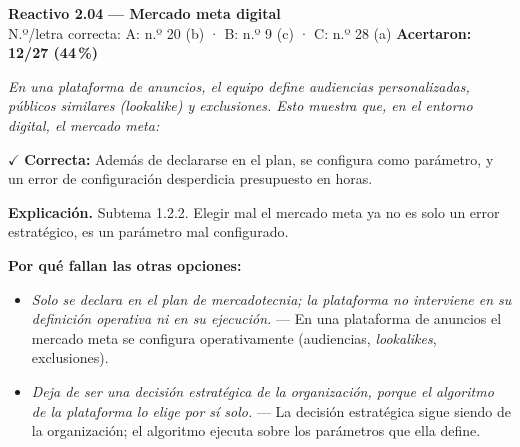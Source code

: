 \documentclass[10pt,letterpaper]{article}
\begin{document}
\begin{minipage}{\textwidth}
{\color{guinda}\textbf{Reactivo 2.04}} \textbf{— Mercado meta digital}\\[-1pt]
{\scriptsize N.º/letra correcta: A: n.º 20 (b) · B: n.º 9 (c) · C: n.º 28 (a) \hfill \textbf{Acertaron: 12/27 (44\,\%)}}

\textit{En una plataforma de anuncios, el equipo define audiencias personalizadas, públicos similares (\textit{lookalike}) y exclusiones. Esto muestra que, en el entorno digital, el mercado meta:}

\textcolor{verde}{$\checkmark$} \textbf{Correcta:} Además de declararse en el plan, se configura como parámetro, y un error de configuración desperdicia presupuesto en horas.

\textbf{Explicación.} Subtema 1.2.2. Elegir mal el mercado meta ya no es solo un error estratégico, es un parámetro mal configurado.

\textbf{Por qué fallan las otras opciones:}
\begin{itemize}[itemsep=0pt,topsep=1pt,leftmargin=1.3em,parsep=0pt]
\item[\textcolor{rojo}{$\times$}] \textit{Solo se declara en el plan de mercadotecnia; la plataforma no interviene en su definición operativa ni en su ejecución.} --- En una plataforma de anuncios el mercado meta se configura operativamente (audiencias, \textit{lookalikes}, exclusiones).
\item[\textcolor{rojo}{$\times$}] \textit{Deja de ser una decisión estratégica de la organización, porque el algoritmo de la plataforma lo elige por sí solo.} --- La decisión estratégica sigue siendo de la organización; el algoritmo ejecuta sobre los parámetros que ella define.
\end{itemize}
\end{minipage}\par\vspace{5pt}{\color{gray!40}\hrule}\vspace{5pt}
\end{document}
